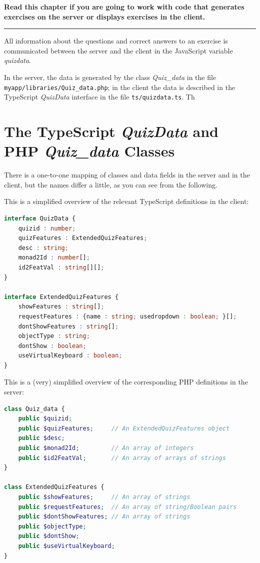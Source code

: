 \documentclass[11pt,oneside,a4paper]{memoir}
\begin{document}
\textbf{Read this chapter if you are going to work with code that generates exercises on
  the server or displays exercises in the client.} 
\plainbreak{3}

All information about the questions and correct answers to an exercise is communicated between the
server and the client in the JavaScript variable \emph{quizdata}.

In the server, the data is generated by the class \emph{Quiz\_data} in the file
\texttt{myapp/libraries/Quiz\_data.php}; in the client the data is described in the TypeScript
\emph{QuizData} interface in the file \texttt{ts/quizdata.ts}. Th



\section{The TypeScript \emph{QuizData} and PHP \emph{Quiz\_data} Classes}

There is a one-to-one mapping of classes and data fields in the server and in the client, but the
names differ a little, as you can see from the following.

This is a simplified overview of the relevant TypeScript definitions in the client:

\begin{lstlisting}[language=TypeScript]
interface QuizData {
    quizid : number;
    quizFeatures : ExtendedQuizFeatures;
    desc : string;
    monad2Id : number[];
    id2FeatVal : string[][];
}

interface ExtendedQuizFeatures {
    showFeatures : string[];
    requestFeatures : {name : string; usedropdown : boolean; }[];
    dontShowFeatures : string[];
    objectType : string;
    dontShow : boolean;
    useVirtualKeyboard : boolean;
}
\end{lstlisting}

This is a (very) simplified overview of the corresponding PHP definitions in the server:

\begin{lstlisting}[language=PHP]
class Quiz_data {
    public $quizid;
    public $quizFeatures;     // An ExtendedQuizFeatures object
    public $desc;
    public $monad2Id;         // An array of integers
    public $id2FeatVal;       // An array of arrays of strings
}

class ExtendedQuizFeatures {
    public $showFeatures;     // An array of strings
    public $requestFeatures;  // An array of string/Boolean pairs
    public $dontShowFeatures; // An array of strings
    public $objectType;
    public $dontShow;
    public $useVirtualKeyboard;
}
\end{lstlisting}
\end{document}

